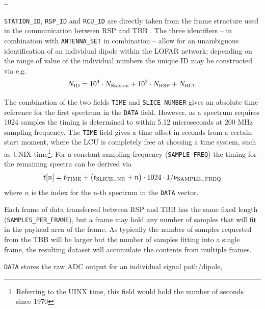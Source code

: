 \documentclass[a4paper,10pt,bibtotoc]{scrartcl}
\begin{document}

\begin{list}{\textbf{--}}{}
\item \verb|STATION_ID|, \verb|RSP_ID| and \verb|RCU_ID| are directly taken
  from the frame structure used in the communication between RSP and TBB 
  \cite{poiesz.2006}. The three identifiers -- in combination with
  \verb|ANTENNA_SET| in combination -- allow for an unambiguous
  identification of an individual dipole within the LOFAR network; 
  depending on the range of value of the individual numbers the unique ID
  may be constructed via e.g.
  \begin{equation}
    N_{\rm ID} = 10^4 \cdot N_{\rm Station} + 10^2 \cdot N_{\rm RSP} +
    N_{\rm RCU}
  \end{equation}
\item The combination of the two fields \verb|TIME| and \verb|SLICE_NUMBER|
  gives an absolute time reference for the first spectrum in the \verb|DATA|
  field. However, as a spectrum requires 1024 samples the timing is determined
  to within 5.12 microseconds at 200 MHz sampling frequency.
  The \verb|TIME| field gives a time offset in seconds from a certain
  start moment, where the LCU is completely free at chossing a time system,
  such as UNIX time\footnote{Referring to the UINX time, this field would hold
    the number of seconds since 1970}. For a constant sampling frequency
  (\verb|SAMPLE_FREQ|) the timing for the remaining spectra can be derived
  via \cite{poiesz.2006}
  \begin{equation}
    t[n] = t_{\rm TIME} + \left( t_{\rm SLICE_-NR} + n  \right) \cdot 1024
    \cdot 1/\nu_{\rm SAMPLE_-FREQ}
  \end{equation}
  where $n$ is the index for the n-th spectrum in the \verb|DATA| vector.
\item Each frame of data transferred between RSP and TBB has the same fixed
  length (\verb|SAMPLES_PER_FRAME|), but a frame may hold any number of samples
  that will fit in the payload area of the frame. As typically the
  number of samples requested from the TBB will be larger but the
  number of samples fitting into a single frame, the resulting dataset
  will accumulate the contents from multiple frames.
\item \verb|DATA| stores the raw ADC output for an individual signal path/dipole,

\end{list}
\end{document}
